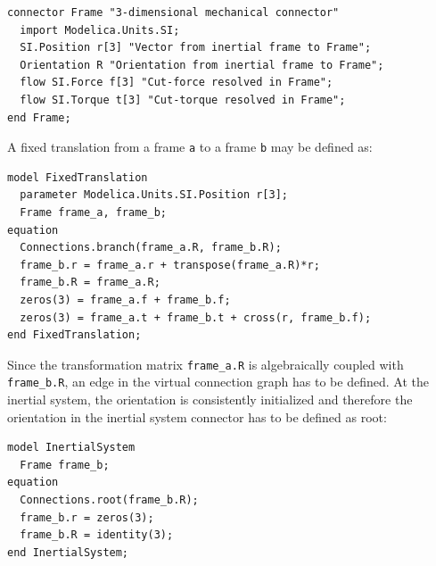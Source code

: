 \begin{nonnormative}
\begin{lstlisting}[language=modelica]
connector Frame "3-dimensional mechanical connector"
  import Modelica.Units.SI;
  SI.Position r[3] "Vector from inertial frame to Frame";
  Orientation R "Orientation from inertial frame to Frame";
  flow SI.Force f[3] "Cut-force resolved in Frame";
  flow SI.Torque t[3] "Cut-torque resolved in Frame";
end Frame;
\end{lstlisting}
A fixed translation from a frame \lstinline!a! to a frame \lstinline!b! may be defined as:
\begin{lstlisting}[language=modelica]
model FixedTranslation
  parameter Modelica.Units.SI.Position r[3];
  Frame frame_a, frame_b;
equation
  Connections.branch(frame_a.R, frame_b.R);
  frame_b.r = frame_a.r + transpose(frame_a.R)*r;
  frame_b.R = frame_a.R;
  zeros(3) = frame_a.f + frame_b.f;
  zeros(3) = frame_a.t + frame_b.t + cross(r, frame_b.f);
end FixedTranslation;
\end{lstlisting}
Since the transformation matrix \lstinline!frame_a.R! is algebraically coupled with \lstinline!frame_b.R!, an edge in the virtual connection graph has to be defined.
At the inertial system, the orientation is consistently initialized and therefore the orientation in the inertial system connector has to be defined as root:
\begin{lstlisting}[language=modelica]
model InertialSystem
  Frame frame_b;
equation
  Connections.root(frame_b.R);
  frame_b.r = zeros(3);
  frame_b.R = identity(3);
end InertialSystem;
\end{lstlisting}
\end{nonnormative}
